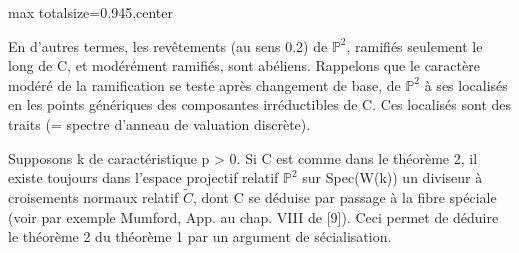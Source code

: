 \documentclass[10pt,a4paper]{article}
\begin{document}
\begin{adjustbox}{max totalsize={\textwidth}{0.945\textheight},center}
\begin{minipage}{\textwidth}
\noindent En d'autres termes, les revêtements (au sens 0.2) de \ensuremath{ℙ^2}, ramifiés seulement le long de C, et modérément ramifiés, sont abéliens. Rappelons que le caractère modéré de la ramification se teste après changement de base, de \ensuremath{ℙ^2} à ses localisés en les points génériques des composantes irréductibles de C. Ces localisés sont des traits (= spectre d'anneau de valuation discrète).\par\smallskip
\noindent Supposons k de caractéristique p > 0. Si C est comme dans le théorème 2, il existe toujours dans l'espace projectif relatif \ensuremath{ℙ^2} sur Spec(W(k)) un diviseur à croisements normaux relatif \ensuremath{\widetilde{C}}, dont C se déduise par passage à la fibre spéciale (voir par exemple Mumford, App. au chap. VIII de [9]). Ceci permet de déduire le théorème 2 du théorème 1 par un argument de sécialisation.\par\smallskip
\end{minipage}
\end{adjustbox}
\newpage
\end{document}
